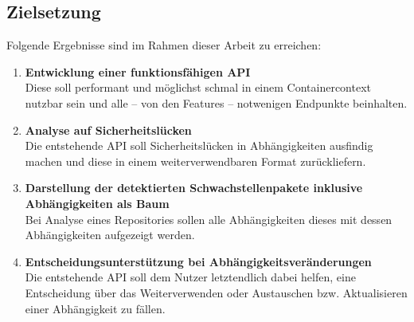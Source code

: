 \subsection{Zielsetzung} \label{sec:Zielsetzung}
    Folgende Ergebnisse sind im Rahmen dieser Arbeit zu erreichen:
    \begin{enumerate}
        \item \textbf{Entwicklung einer funktionsfähigen \ac{API}} \\
            Diese soll performant und möglichst schmal in einem Containercontext nutzbar sein und alle -- von den Features -- notwenigen Endpunkte beinhalten.
        \item \textbf{Analyse auf Sicherheitslücken} \\
            Die entstehende \ac{API} soll Sicherheitslücken in Abhängigkeiten ausfindig machen und diese in einem weiterverwendbaren Format zurückliefern.
        \item \textbf{Darstellung der detektierten Schwachstellenpakete inklusive Abhängigkeiten als Baum} \\
            Bei Analyse eines Repositories sollen alle Abhängigkeiten dieses mit dessen Abhängigkeiten aufgezeigt werden.
        \item \textbf{Entscheidungsunterstützung bei Abhängigkeitsveränderungen} \\
            Die entstehende \ac{API} soll dem Nutzer letztendlich dabei helfen, eine Entscheidung über das Weiterverwenden oder Austauschen bzw. Aktualisieren einer Abhängigkeit zu fällen.
    \end{enumerate}